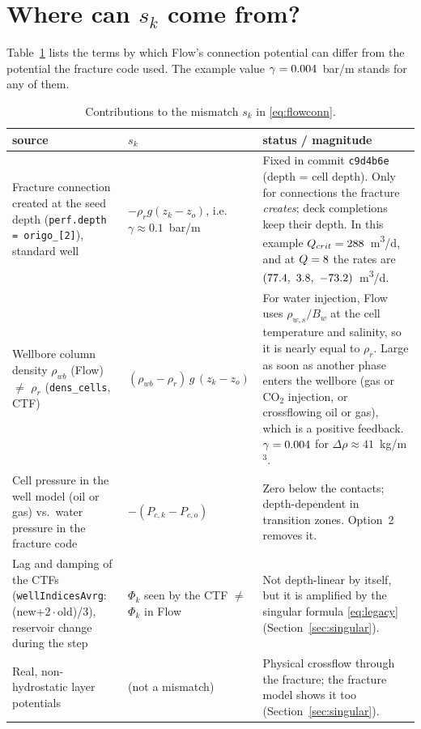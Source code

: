 \documentclass[11pt,a4paper]{article}
\newcommand{\rated}{\si{m^3/d}}
\begin{document}
\section{Where can $s_k$ come from?}
\label{sec:sources}

Table~\ref{tab:sources} lists the terms by which Flow's connection potential can differ from
the potential the fracture code used.  The example value $\gamma=0.004$~bar/m stands for
any of them.

\begin{table}[ht]
\centering\small
\begin{tabular}{p{4.6cm}p{4.3cm}p{5.6cm}}
\toprule
source & $s_k$ & status / magnitude \\
\midrule
Fracture connection created at the seed depth (\texttt{perf.depth = origo\_[2]}), standard
well & $-\rho_r g(z_k-z_o)$, i.e.\ $\gamma\approx0.1$~bar/m &
Fixed in commit \texttt{c9d4b6e} (depth = cell depth).  Only for connections the fracture
\emph{creates}; deck completions keep their depth.  In this example
$Q_{crit}=288$~\rated, and at $Q=8$ the rates are
$(\qseedtop,\ \qseedmid,\ \qseedbot)$~\rated. \\[2pt]
Wellbore column density $\rho_{wb}$ (Flow) $\neq$ $\rho_r$ (\texttt{dens\_cells}, CTF) &
$(\rho_{wb}-\rho_r)\,g\,(z_k-z_o)$ &
For water injection, Flow uses $\rho_{w,s}/B_w$ at the cell temperature and salinity, so it is
nearly equal to $\rho_r$.  Large as soon as another phase enters the wellbore (gas or CO$_2$
injection, or crossflowing oil or gas), which is a positive feedback.  $\gamma=0.004$ for
$\Delta\rho\approx41$~kg/m$^3$. \\[2pt]
Cell pressure in the well model (oil or gas) vs.\ water pressure in the fracture code &
$-(P_{c,k}-P_{c,o})$ &
Zero below the contacts; depth-dependent in transition zones.  Option~2 removes it. \\[2pt]
Lag and damping of the CTFs (\texttt{wellIndicesAvrg}: (new$+2\cdot$old)/3), reservoir change
during the step &
$\Phi_k$ seen by the CTF $\neq$ $\Phi_k$ in Flow &
Not depth-linear by itself, but it is amplified by the singular formula
\eqref{eq:legacy} (Section~\ref{sec:singular}). \\[2pt]
Real, non-hydrostatic layer potentials &
(not a mismatch) &
Physical crossflow through the fracture; the fracture model shows it too
(Section~\ref{sec:singular}). \\
\bottomrule
\end{tabular}
\caption{Contributions to the mismatch $s_k$ in \eqref{eq:flowconn}.}
\label{tab:sources}
\end{table}
\end{document}
